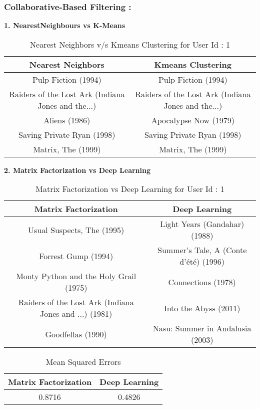 \documentclass[a4paper]{article}
\theoremstyle{plain}
\theoremstyle{definition}
\begin{document}
\subsubsection{Collaborative-Based Filtering : }
\bigskip
\textbf{1. NearestNeighbours vs K-Means}

\begin{table}[htbp]
    \centering
    \caption{Nearest Neighbors v/s Kmeans Clustering for User Id : 1}
    \begin{tabular}{|c|c|}
        \hline
        \textbf{Nearest Neighbors} & \textbf{Kmeans Clustering} \\
        \hline
        Pulp Fiction (1994) & Pulp Fiction (1994) \\
        Raiders of the Lost Ark (Indiana Jones and the...) & Raiders of the Lost Ark (Indiana Jones and the...) \\
        Aliens (1986) & Apocalypse Now (1979) \\
        Saving Private Ryan (1998) & Saving Private Ryan (1998) \\
        Matrix, The (1999) & Matrix, The (1999) \\
        \hline
    \end{tabular}
    \label{tab:experiments}
\end{table}

\newpage
\textbf{2. Matrix Factorization vs Deep Learning}

\begin{table}[htbp]
    \centering
    \caption{Matrix Factorization vs Deep Learning for User Id : 1}
    \begin{tabular}{|c|c|}
        \hline
        \textbf{Matrix Factorization} & \textbf{Deep Learning} \\
        \hline
        Usual Suspects, The (1995) & Light Years (Gandahar) (1988) \\
        Forrest Gump (1994) & Summer's Tale, A (Conte d'été) (1996) \\
        Monty Python and the Holy Grail (1975) & Connections (1978) \\
        Raiders of the Lost Ark (Indiana Jones and ...) (1981) & Into the Abyss (2011) \\
        Goodfellas (1990) & Nasu: Summer in Andalusia (2003) \\
        \hline
    \end{tabular}
    \label{tab:matrix_deep_experiments}
\end{table}

\begin{table}[htbp]
    \centering
    \caption{Mean Squared Errors}
    \begin{tabular}{|c|c|}
        \hline
        \textbf{Matrix Factorization} & \textbf{Deep Learning} \\
        \hline
        0.8716 & 0.4826 \\
        \hline
    \end{tabular}
    \label{tab:mean_squared_errors}
\end{table}
\end{document}
